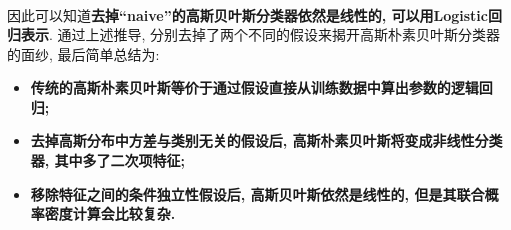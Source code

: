\documentclass{article}
\begin{document}
\begin{homeworkProblem}
\begin{align}
	\end{align}
	因此可以知道\textbf{去掉“naive”的高斯贝叶斯分类器依然是线性的, 可以用Logistic回归表示}.
	\newpage
	通过上述推导, 分别去掉了两个不同的假设来揭开高斯朴素贝叶斯分类器的面纱, 最后简单总结为:
	\begin{itemize}
		\item \textbf{传统的高斯朴素贝叶斯等价于通过假设直接从训练数据中算出参数的逻辑回归;}
		\item \textbf{去掉高斯分布中方差与类别无关的假设后, 高斯朴素贝叶斯将变成非线性分类器, 其中多了二次项特征;}
		\item \textbf{移除特征之间的条件独立性假设后, 高斯贝叶斯依然是线性的, 但是其联合概率密度计算会比较复杂.}
	\end{itemize}
\end{homeworkProblem}
\end{document}
